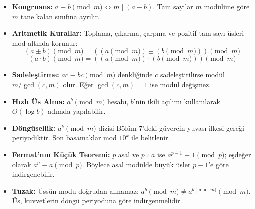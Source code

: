 \begin{itemize}
    \item \textbf{Kongruans:} $a \equiv b \pmod m \iff m \mid (a - b)$. Tam sayılar $m$ modülüne göre $m$ tane kalan sınıfına ayrılır.
    \item \textbf{Aritmetik Kurallar:} Toplama, çıkarma, çarpma ve pozitif tam sayı üsleri mod altında korunur:
    \[
    (a \pm b) \pmod m = ((a \pmod m) \pm (b \pmod m)) \pmod m
    \]
    \[
    (a \cdot b) \pmod m = ((a \pmod m) \cdot (b \pmod m)) \pmod m
    \]
    \item \textbf{Sadeleştirme:} $ac \equiv bc \pmod m$ denkliğinde $c$ sadeleştirilirse modül $m / \gcd(c, m)$ olur. Eğer $\gcd(c, m) = 1$ ise modül değişmez.
    \item \textbf{Hızlı Üs Alma:} $a^b \pmod m$ hesabı, $b$'nin ikili açılımı kullanılarak $O(\log b)$ adımda yapılabilir.
\item \textbf{Döngüsellik:} $a^k \pmod m$ dizisi Bölüm 7'deki güvercin yuvası ilkesi gereği periyodiktir. Son basamaklar mod $10^k$ ile belirlenir.
    \item \textbf{Fermat'nın Küçük Teoremi:} $p$ asal ve $p \nmid a$ ise $a^{p-1} \equiv 1 \pmod p$; eşdeğer olarak $a^p \equiv a \pmod p$. Böylece asal modülde büyük üsler $p-1$'e göre indirgenebilir.
    \item \textbf{Tuzak:} Üssün modu doğrudan alınamaz: $a^b \pmod m \ne a^{b \pmod m} \pmod m$. Üs, kuvvetlerin döngü periyoduna göre indirgenmelidir.
\end{itemize}
